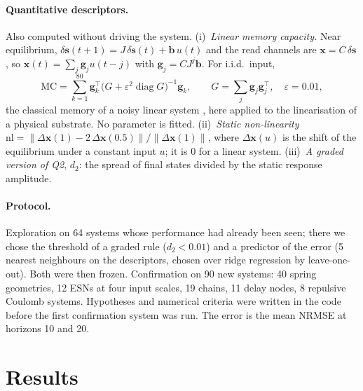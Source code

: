 \documentclass[10pt,a4paper]{article}
\begin{document}
\paragraph{Quantitative descriptors.} Also computed without driving the system.
(i)~\emph{Linear memory capacity.} Near equilibrium, $\delta\mathbf s(t+1) = J\,\delta\mathbf
s(t) + \mathbf b\,u(t)$ and the read channels are $\mathbf x = C\,\delta\mathbf s$, so
$\mathbf x(t) = \sum_j \mathbf g_j u(t-j)$ with $\mathbf g_j = C J^j \mathbf b$. For i.i.d.\
input,
\begin{equation*}
  \mathrm{MC} = \sum_{k=1}^{80} \mathbf g_k^{\top}\bigl(G + \varepsilon^2 \operatorname{diag} G\bigr)^{-1}\mathbf g_k ,
  \qquad G = \sum_j \mathbf g_j \mathbf g_j^{\top},\quad \varepsilon = 0.01,
\end{equation*}
the classical memory of a noisy linear system \cite{jaeger2002,white2004,ganguli2008,dambre2012},
here applied to the linearisation of a physical substrate. No parameter is fitted.
(ii)~\emph{Static non-linearity}
$\mathrm{nl} = \lVert\Delta\mathbf x(1) - 2\,\Delta\mathbf x(0.5)\rVert / \lVert\Delta\mathbf x(1)\rVert$,
where $\Delta\mathbf x(u)$ is the shift of the equilibrium under a constant input $u$; it is 0
for a linear system. (iii)~\emph{A graded version of Q2}, $d_2$: the spread of final states
divided by the static response amplitude.

\paragraph{Protocol.} Exploration on 64 systems whose performance had already been seen;
there we chose the threshold of a graded rule ($d_2 < 0.01$) and a predictor of the error
(5 nearest neighbours on the descriptors, chosen over ridge regression by leave-one-out).
Both were then frozen. Confirmation on 90 new systems: 40 spring geometries, 12 ESNs at four
input scales, 19 chains, 11 delay nodes, 8 repulsive Coulomb systems. Hypotheses and
numerical criteria were written in the code before the first confirmation system was run.
The error is the mean NRMSE at horizons 10 and 20.

\section{Results}
\end{document}
